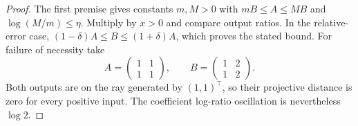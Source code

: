 \begin{proof}
The first premise gives constants $m,M>0$ with $mB\le A\le MB$
and $\log(M/m)\le\eta$. Multiply by $x>0$ and compare output
ratios. In the relative-error case,
$(1-\delta)A\le B\le(1+\delta)A$, which proves the stated bound.
For failure of necessity take
\[
 A=\begin{pmatrix}1&1\\1&1\end{pmatrix},\qquad
 B=\begin{pmatrix}1&2\\1&2\end{pmatrix}.
\]
Both outputs are on the ray generated by $(1,1)^\top$, so their
projective distance is zero for every positive input. The coefficient
log-ratio oscillation is nevertheless $\log2$.
\end{proof}
